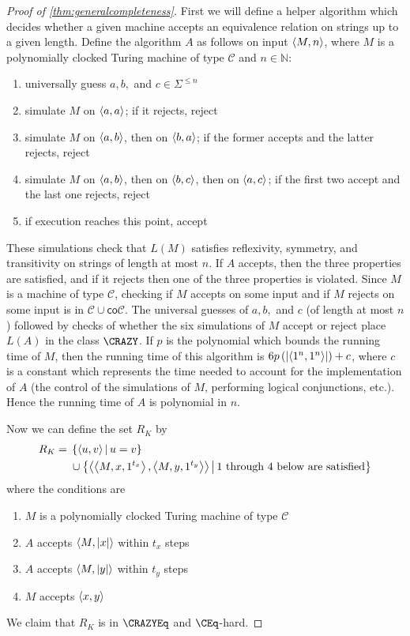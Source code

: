 \begin{proof}[Proof of \autoref{thm:generalcompleteness}]
  First we will define a helper algorithm which decides whether a given machine accepts an equivalence relation on strings up to a given length.
  Define the algorithm $A$ as follows on input $\left\langle M,n\right\rangle$, where $M$ is a polynomially clocked Turing machine of type $\mathcal{C}$ and $n\in\mathbb{N}$:
  \begin{enumerate}
  \item universally guess $a,b,$ and $c\in\Sigma^{\leq n}$
  \item simulate $M$ on $\left\langle a,a\right\rangle$; if it rejects, reject
  \item simulate $M$ on $\left\langle a,b\right\rangle$, then on $\left\langle b,a\right\rangle$; if the former accepts and the latter rejects, reject
  \item simulate $M$ on $\left\langle a,b\right\rangle$, then on $\left\langle b,c\right\rangle$, then on $\left\langle a,c\right\rangle$; if the first two accept and the last one rejects, reject
  \item if execution reaches this point, accept
  \end{enumerate}
  These simulations check that $L(M)$ satisfies reflexivity, symmetry, and transitivity on strings of length at most $n$.
  If $A$ accepts, then the three properties are satisfied, and if it rejects then one of the three properties is violated.
  Since $M$ is a machine of type $\mathcal{C}$, checking if $M$ accepts on some input and if $M$ rejects on some input is in $\mathcal{C}\cup\mathsf{co}\mathcal{C}$.
  The universal guesses of $a,b,$ and $c$ (of length at most $n$) followed by checks of whether the six simulations of $M$ accept or reject place $L(A)$ in the class $\CRAZY$.
  If $p$ is the polynomial which bounds the running time of $M$, then the running time of this algorithm is $6p\left(\left|\left\langle1^n,1^n\right\rangle\right|\right)+c$, where $c$ is a constant which represents the time needed to account for the implementation of $A$ (the control of the simulations of $M$, performing logical conjunctions, etc.).
  Hence the running time of $A$ is polynomial in $n$.

  Now we can define the set $R_K$ by
  \begin{align*}
    R_K = {} & \left\{\left\langle u,v\right\rangle \,\middle|\, u=v\right\} \\
    & \cup \left\{\left\langle\left\langle M,x,1^{t_x}\right\rangle,\left\langle M,y,1^{t_y}\right\rangle\right\rangle \,\middle|\, \textnormal{1 through 4 below are satisfied}\right\}
  \end{align*}
  where the conditions are
  \begin{enumerate}
  \item\label{itm:machine} $M$ is a polynomially clocked Turing machine of type $\mathcal{C}$
  \item\label{itm:emx} $A$ accepts $\left\langle M,|x|\right\rangle$ within $t_x$ steps
  \item\label{itm:emy} $A$ accepts $\left\langle M,|y|\right\rangle$ within $t_y$ steps
  \item\label{itm:accepts} $M$ accepts $\left\langle x,y\right\rangle$
  \end{enumerate}
  We claim that $R_K$ is in $\CRAZYEq$ and $\CEq$-hard.


\end{proof}
